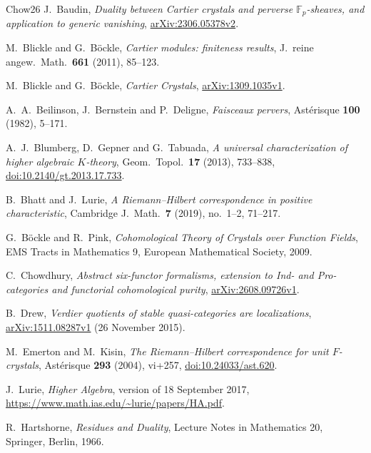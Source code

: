 \documentclass[11pt]{amsart}
\newcommand{\F}{\mathbb{F}}
\theoremstyle{plain}
\theoremstyle{definition}
\numberwithin{equation}{section}
\begin{document}
\begin{thebibliography}{Chow26}
J.~Baudin, \emph{Duality between Cartier crystals and perverse $\F_p$-sheaves, and application to generic vanishing}, \href{https://arxiv.org/abs/2306.05378v2}{arXiv:2306.05378v2}.

M.~Blickle and G.~B\"ockle, \emph{Cartier modules: finiteness results}, J.\ reine angew.\ Math.\ \textbf{661} (2011), 85--123.

M.~Blickle and G.~B\"ockle, \emph{Cartier Crystals},
\href{https://arxiv.org/abs/1309.1035v1}{arXiv:1309.1035v1}.

A.~A.~Beilinson, J.~Bernstein and P.~Deligne, \emph{Faisceaux pervers}, Ast\'erisque \textbf{100} (1982), 5--171.

A.~J.~Blumberg, D.~Gepner and G.~Tabuada, \emph{A universal characterization of higher algebraic $K$-theory}, Geom.\ Topol.\ \textbf{17} (2013), 733--838, \href{https://doi.org/10.2140/gt.2013.17.733}{doi:10.2140/gt.2013.17.733}.

B.~Bhatt and J.~Lurie, \emph{A Riemann--Hilbert correspondence in positive characteristic}, Cambridge J.\ Math.\ \textbf{7} (2019), no.~1--2, 71--217.

G.~B\"ockle and R.~Pink, \emph{Cohomological Theory of Crystals over Function Fields}, EMS Tracts in Mathematics 9, European Mathematical Society, 2009.

C.~Chowdhury, \emph{Abstract six-functor formalisms, extension to Ind- and Pro-categories and functorial cohomological purity}, \href{https://arxiv.org/abs/2608.09726v1}{arXiv:2608.09726v1}.

B.~Drew, \emph{Verdier quotients of stable quasi-categories are localizations}, \href{https://arxiv.org/abs/1511.08287v1}{arXiv:1511.08287v1} (26 November 2015).

M.~Emerton and M.~Kisin, \emph{The Riemann--Hilbert correspondence for unit $F$-crystals},
Ast\'erisque \textbf{293} (2004), vi+257,
\href{https://doi.org/10.24033/ast.620}{doi:10.24033/ast.620}.

J.~Lurie, \emph{Higher Algebra}, version of 18 September 2017, \url{https://www.math.ias.edu/~lurie/papers/HA.pdf}.

R.~Hartshorne, \emph{Residues and Duality}, Lecture Notes in Mathematics 20, Springer, Berlin, 1966.


\end{thebibliography}
\end{document}
